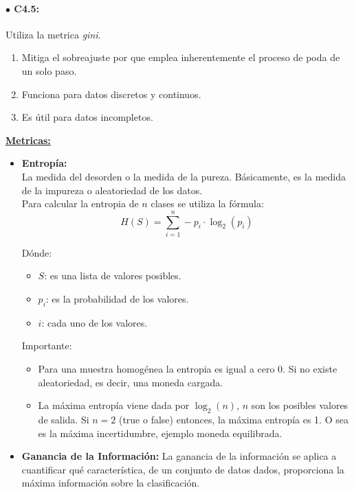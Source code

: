 \documentclass[../main.tex]{subfiles}
\begin{document}
                \paragraph{$\bullet$ C4.5:}
                Utiliza la metrica \textit{gini}.
            
                \begin{enumerate}
                    \item Mitiga el sobreajuste por que emplea inherentemente el proceso de poda de un solo paso.
                    \item Funciona para datos discretos y continuos.
                    \item Es útil para datos incompletos.
                \end{enumerate}
            
            \underline{\textbf{Metricas:}}
            \begin{itemize} 
                \item 
                    \textbf{Entropía:} \\
                    La medida del desorden o la medida de la pureza. Básicamente, es la medida de la impureza o aleatoriedad de los datos.\\

                    Para calcular la entropia de $n$ clases se utiliza la fórmula:
                    \begin{equation}
                        H(S) = \sum_{i=1}^{n} -p_i \cdot  \log_2(p_i)
                    \end{equation}
                
                    Dónde:
                    \begin{itemize}
                        \item $S$: es una lista de valores posibles.
                        \item $p_i$: es la probabilidad de los valores.
                        \item $i$: cada uno de los valores.
                    \end{itemize}
                
                    Importante:
                    \begin{itemize}
                        \item Para una muestra homogénea la entropia es igual a cero 0. Si no existe aleatoriedad, es decir, una moneda cargada.
                        \item La máxima entropía viene dada por $\log_2(n)$, $n$ son los posibles valores de salida. Si $n=2$ (true o false) entonces, la máxima entropía es 1. O sea es la máxima incertidumbre, ejemplo moneda equilibrada.
                    \end{itemize}

                \item 
                    \textbf{Ganancia de la Información:}
                    La ganancia de la información se aplica a cuantificar qué característica, de un conjunto de datos dados, proporciona la máxima información sobre la clasificación.
            \end{itemize}               
        
\end{document}
